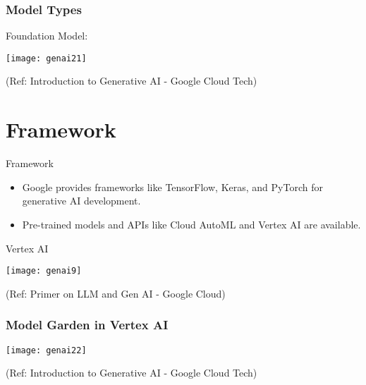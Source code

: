 \begin{frame}[fragile]\frametitle{Model Types}
Foundation Model:

\begin{center}
\texttt{[image: genai21]}
\end{center}


{\tiny (Ref: Introduction to Generative AI - Google Cloud Tech)}

\end{frame}



\section{Framework}

\begin{frame}[fragile]{Framework}
\begin{itemize}
\item Google provides frameworks like TensorFlow, Keras, and PyTorch for generative AI development.
\item Pre-trained models and APIs like Cloud AutoML and Vertex AI are available.
\end{itemize}
\end{frame}

\begin{frame}[fragile]{Vertex AI}

\begin{center}
\texttt{[image: genai9]}
\end{center}

{\tiny (Ref: Primer on LLM and Gen AI - Google Cloud)}
  
\end{frame}


\begin{frame}[fragile]\frametitle{Model Garden in Vertex AI}

\begin{center}
\texttt{[image: genai22]}
\end{center}


{\tiny (Ref: Introduction to Generative AI - Google Cloud Tech)}

\end{frame}

